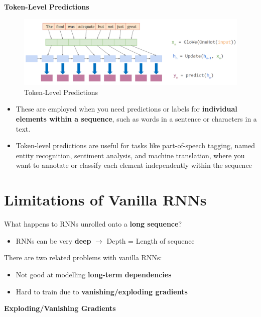 \newpage

\textbf{Token-Level Predictions}

\begin{figure}[h!t]
    \centering
    \includegraphics[width=1\linewidth]{tokenlevelpredictions.png}
    \caption{Token-Level Predictions}
    \label{fig:enter-label}
\end{figure}

\begin{itemize}
    \item These are employed when you need predictions or labels for \textbf{individual elements within a sequence}, such as words in a sentence or characters in a text. 
    \item Token-level predictions are useful for tasks like part-of-speech tagging, named entity recognition, sentiment analysis, and machine translation, where you want to annotate or classify each element independently within the sequence
\end{itemize}
\section{Limitations of Vanilla RNNs}

What happens to RNNs unrolled onto a \textbf{long sequence}?
\begin{itemize}
    \item RNNs can be very \textbf{deep} $\rightarrow$ Depth = Length of sequence
\end{itemize}

There are two related problems with vanilla RNNs:
\begin{itemize}
    \item Not good at modelling \textbf{long-term dependencies}
    \item Hard to train due to \textbf{vanishing/exploding gradients}\\
\end{itemize}

\noindent \textbf{Exploding/Vanishing Gradients}\\

